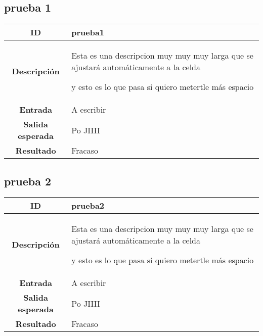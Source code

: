 \documentclass{scrartcl}
\begin{document}
\subsection{prueba 1}

\begin{tabularx}{14cm}{|c|X|}
	\hline \textbf{ID} & prueba1 \\ 
	\hline \textbf{Descripción} & Esta es una descripcion muy muy muy larga que se ajustará automáticamente a la celda
	
	y esto es lo que pasa si quiero metertle más espacio \\	 
	\hline  \textbf{Entrada}		& A escribir \\ 
	\hline  \textbf{Salida esperada}			& Po JIIII \\
	\hline  \textbf{Resultado}			& Fracaso \\
	\hline 
\end{tabularx} 

\subsection{prueba 2}

\begin{tabularx}{14cm}{|c|X|}
	\hline \textbf{ID} & prueba2 \\ 
	\hline \textbf{Descripción} & Esta es una descripcion muy muy muy larga que se ajustará automáticamente a la celda
	
	y esto es lo que pasa si quiero metertle más espacio \\	 
	\hline  \textbf{Entrada}		& A escribir \\ 
	\hline  \textbf{Salida esperada}			& Po JIIII \\
	\hline  \textbf{Resultado}			& Fracaso \\
	\hline 
\end{tabularx} 
\end{document}

